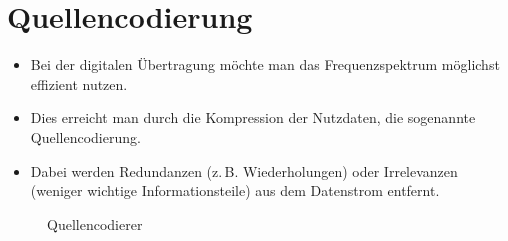 
\section{Quellencodierung}
\label{section:quellencodierung}
\begin{frame}%
\begin{itemize}
  \item Bei der digitalen Übertragung möchte man das Frequenzspektrum möglichst effizient nutzen.
  \item Dies erreicht man durch die Kompression der Nutzdaten, die sogenannte Quellencodierung.
  \item Dabei werden Redundanzen (z. B. Wiederholungen) oder Irrelevanzen (weniger wichtige Informationsteile) aus dem Datenstrom entfernt.
  \end{itemize}

\begin{figure}
    \caption{\scriptsize Quellencodierer}
    \label{quellencodierer}
\end{figure}

\end{frame}

\begin{frame}
\end{frame}%
